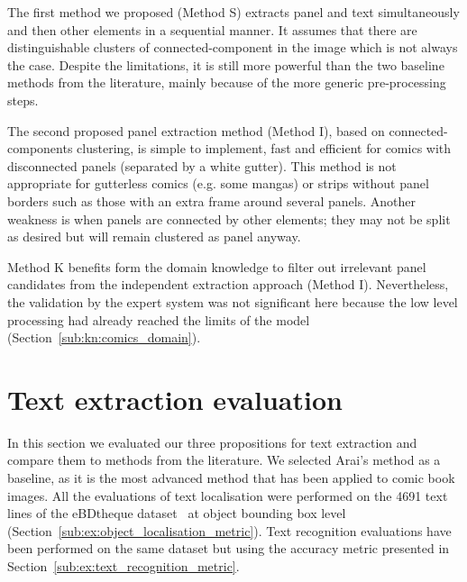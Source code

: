 The first method we proposed (Method S) extracts panel and text simultaneously and then other elements in a sequential manner.
It assumes that there are distinguishable clusters of connected-component in the image which is not always the case.
Despite the limitations, it is still more powerful than the two baseline methods from the literature, mainly because of the more generic pre-processing steps.

The second proposed panel extraction method (Method I), based on connected-components clustering, is simple to implement, fast and efficient for comics with disconnected panels (separated by a white gutter).
This method is not appropriate for gutterless comics (e.g. some mangas) or strips without panel borders such as those with an extra frame around several panels.
Another weakness is when panels are connected by other elements; they may not be split as desired but will remain clustered as panel anyway.

Method K benefits form the domain knowledge to filter out irrelevant panel candidates from the independent extraction approach (Method I).
Nevertheless, the validation by the expert system was not significant here because the low level processing had already reached the limits of the model (Section~\ref{sub:kn:comics_domain}).






\section{Text extraction evaluation} %
\label{sub:ex:text_extraction_recognition_evaluation}

In this section we evaluated our three propositions for text extraction and compare them to methods from the literature.
We selected Arai's method as a baseline, as it is the most advanced method that has been applied to comic book images.
All the evaluations of text localisation were performed on the 4691 text lines of the eBDtheque dataset~\cite{Guerin2013} at object bounding box level (Section~\ref{sub:ex:object_localisation_metric}).
Text recognition evaluations have been performed on the same dataset but using the accuracy metric presented in Section~\ref{sub:ex:text_recognition_metric}.

